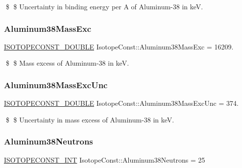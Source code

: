 \$ \$ Uncertainty in binding energy per A of Aluminum-\/38 in keV. \mbox{\label{group___isotope_const-_aluminum-_al38_ga2c72c355a482f54a0aa60ff80ed2a1fb}} 
\subsubsection{\texorpdfstring{Aluminum38\+Mass\+Exc}{Aluminum38MassExc}}
{\footnotesize\ttfamily \mbox{\hyperlink{group___isotope_const-_macros_ga8f45a7272ce02c0b4c65c44636ed719a}{I\+S\+O\+T\+O\+P\+E\+C\+O\+N\+S\+T\+\_\+\+D\+O\+U\+B\+LE}} Isotope\+Const\+::\+Aluminum38\+Mass\+Exc = 16209.}

\$ \$ Mass excess of Aluminum-\/38 in keV. \mbox{\label{group___isotope_const-_aluminum-_al38_ga95e3a23c715d73686799458962fc410f}} 
\subsubsection{\texorpdfstring{Aluminum38\+Mass\+Exc\+Unc}{Aluminum38MassExcUnc}}
{\footnotesize\ttfamily \mbox{\hyperlink{group___isotope_const-_macros_ga8f45a7272ce02c0b4c65c44636ed719a}{I\+S\+O\+T\+O\+P\+E\+C\+O\+N\+S\+T\+\_\+\+D\+O\+U\+B\+LE}} Isotope\+Const\+::\+Aluminum38\+Mass\+Exc\+Unc = 374.}

\$ \$ Uncertainty in mass excess of Aluminum-\/38 in keV. \mbox{\label{group___isotope_const-_aluminum-_al38_gad4e453be0c66caef066455de527c2815}} 
\subsubsection{\texorpdfstring{Aluminum38\+Neutrons}{Aluminum38Neutrons}}
{\footnotesize\ttfamily \mbox{\hyperlink{group___isotope_const-_macros_ga5f18360b3e99483a35c32d789e62621c}{I\+S\+O\+T\+O\+P\+E\+C\+O\+N\+S\+T\+\_\+\+I\+NT}} Isotope\+Const\+::\+Aluminum38\+Neutrons = 25}


